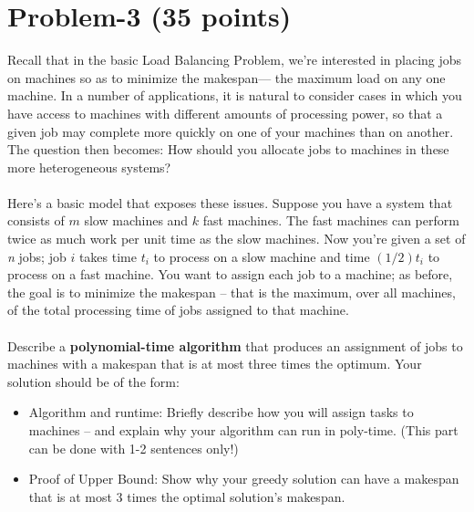 \documentclass[11pt]{article}
\begin{document}
\newpage
\section*{Problem-3 (35 points)}
Recall that in the basic Load Balancing Problem, we’re interested in placing jobs on machines so as to minimize the makespan— the maximum load on any one machine. In a number of applications, it is natural to consider cases in which you have access to machines with different amounts of processing power, so that a given job may complete more quickly on one of your machines than on another. The question then becomes: How should you allocate jobs to machines in these more heterogeneous systems?
\\ \\
Here’s a basic model that exposes these issues. Suppose you have a system that consists of $m$ slow machines and $k$ fast machines. The fast machines can perform twice as much work per unit time as the slow machines. Now you’re given a set of \textit{n} jobs; job $i$ takes time $\mathit{t_i}$ to process on a slow machine and time $\mathit{(1/2)t_i}$ to process on a fast machine. You want to assign each job to a machine; as before, the goal is to minimize the makespan -- that is the maximum, over all machines, of the total processing time of jobs assigned to that machine.
\\ \\
Describe a \textbf{polynomial-time algorithm} that produces an assignment of jobs to machines with a makespan that is at most three times the optimum. Your solution should be of the form:
\begin{itemize}
    \item Algorithm and runtime: Briefly describe how you will assign tasks to machines -- and explain why your algorithm can run in poly-time. (This part can be done with 1-2 sentences only!)
    \item Proof of Upper Bound: Show why your greedy solution can have a makespan that is at most 3 times the optimal solution's makespan.
    
\end{itemize}
\end{document}
